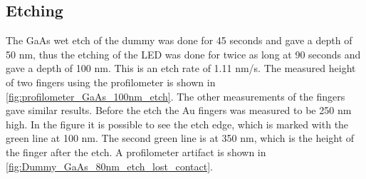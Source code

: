 








\subsection{Etching}

The GaAs wet etch of the dummy was done for 45 seconds and gave a depth of 50 nm, thus the etching of the LED was done for twice as long at 90 seconds and gave a depth of 100 nm.
This is an etch rate of 1.11 nm/s.
The measured height of two fingers using the profilometer is shown in \autoref{fig:profilometer_GaAs_100nm_etch}.
The other measurements of the fingers gave similar results.
Before the etch the Au fingers was measured to be 250 nm high.
In the figure it is possible to see the etch edge, which is marked with the green line at 100 nm. 
The second green line is at 350 nm, which is the height of the finger after the etch.
A profilometer artifact is shown in \autoref{fig:Dummy_GaAs_80nm_etch_lost_contact}.



